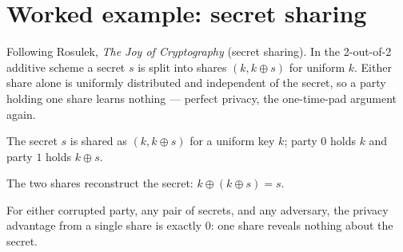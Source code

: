 \chapter{Worked example: secret sharing}

Following Rosulek, \emph{The Joy of Cryptography} (secret sharing). In the
2-out-of-2 additive scheme a secret $s$ is split into shares $(k, k \oplus s)$ for
uniform $k$. Either share alone is uniformly distributed and independent of the
secret, so a party holding one share learns nothing --- perfect privacy, the
one-time-pad argument again.

\begin{definition}
  \label{def:ss-share}
  \leanok
  The secret $s$ is shared as $(k, k \oplus s)$ for a uniform key $k$; party $0$
  holds $k$ and party $1$ holds $k \oplus s$.
\end{definition}

\begin{lemma}[Reconstruction]
  \label{lem:ss-reconstruct}
  \leanok
  The two shares reconstruct the secret: $k \oplus (k \oplus s) = s$.
\end{lemma}

\begin{theorem}
  \label{thm:ss-privacy}
  \leanok
  For either corrupted party, any pair of secrets, and any adversary, the privacy
  advantage from a single share is exactly $0$: one share reveals nothing about
  the secret.
\end{theorem}

